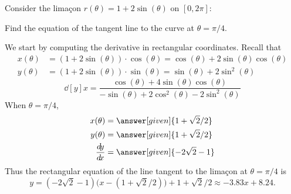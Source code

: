 \documentclass{ximera}
\begin{document}
\begin{example}
  Consider the lima\c con $r(\theta) =1+2\sin(\theta)$ on $[0,2\pi]$:
  \begin{image}
  \end{image}
  Find the equation of the tangent line to the curve at
  $\theta=\pi/4$.
  \begin{explanation}
    We start by computing the derivative in rectangular coordinates. Recall that
    \begin{align*}
      x(\theta) &= \left(1+2\sin(\theta)\right)\cdot \cos(\theta) = \cos(\theta)+2\sin(\theta)\cos(\theta)\\
      y(\theta) &= \left(1+2\sin(\theta)\right)\cdot \sin(\theta) = \sin(\theta)+2\sin^2(\theta)
    \end{align*}
    \[
    \dd[y]{x} = \frac{\cos(\theta) + 4\sin(\theta)\cos(\theta)}{-\sin(\theta) + 2\cos^2(\theta)-2\sin^2(\theta)}
    \]
    When $\theta=\pi/4$,
    \begin{align*}
      x(\theta) &= \answer[given]{1+\sqrt{2}/2}\\
      y(\theta) &=\answer[given]{1+\sqrt{2}/2}\\
    \dd[y]{x} &=\answer[given]{-2\sqrt{2}-1}
    \end{align*}
     Thus the rectangular equation of the line tangent to the lima\c con at $\theta=\pi/4$ is
    \[
    y=(-2\sqrt{2}-1)\big(x-(1+\sqrt{2}/2)\big)+1+\sqrt{2}/2 \approx  -3.83 x+8.24.
    \]
    \begin{prompt}
    \end{prompt}
  \end{explanation}
\end{example}
\end{document}

